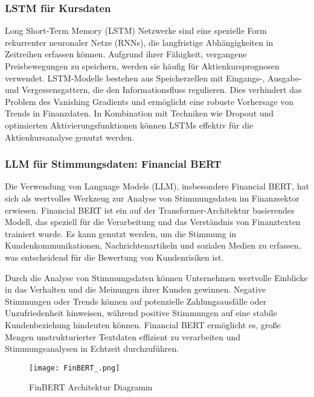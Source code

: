\autocite{chollet2017deep}
\autocite{brownlee2018deep}
\autocite{abiodun2019comprehensive}

\subsubsection{LSTM für Kursdaten}\label{sec:lstm-kursdaten}

Long Short-Term Memory (LSTM) Netzwerke sind eine spezielle Form rekurrenter neuronaler Netze (RNNs), die langfristige Abhängigkeiten in Zeitreihen erfassen können. Aufgrund ihrer Fähigkeit, vergangene Preisbewegungen zu speichern, werden sie häufig für Aktienkursprognosen verwendet. LSTM-Modelle bestehen aus Speicherzellen mit Eingangs-, Ausgabe- und Vergessensgattern, die den Informationsfluss regulieren. Dies verhindert das Problem des Vanishing Gradients und ermöglicht eine robuste Vorhersage von Trends in Finanzdaten. In Kombination mit Techniken wie Dropout und optimierten Aktivierungsfunktionen können LSTMs effektiv für die Aktienkursanalyse genutzt werden.

\autocite{hochreiter1997long}
\autocite{fischer2018deep}
\autocite{siami2019performance}

\subsubsection{LLM für Stimmungsdaten: Financial BERT}

Die Verwendung von Language Models (LLM), insbesondere Financial BERT, hat sich als wertvolles Werkzeug zur Analyse von Stimmungsdaten im Finanzsektor erwiesen. Financial BERT ist ein auf der Transformer-Architektur basierendes Modell, das speziell für die Verarbeitung und das Verständnis von Finanztexten trainiert wurde. Es kann genutzt werden, um die Stimmung in Kundenkommunikationen, Nachrichtenartikeln und sozialen Medien zu erfassen, was entscheidend für die Bewertung von Kundenrisiken ist.

Durch die Analyse von Stimmungsdaten können Unternehmen wertvolle Einblicke in das Verhalten und die Meinungen ihrer Kunden gewinnen. Negative Stimmungen oder Trends können auf potenzielle Zahlungsausfälle oder Unzufriedenheit hinweisen, während positive Stimmungen auf eine stabile Kundenbeziehung hindeuten können. Financial BERT ermöglicht es, große Mengen unstrukturierter Textdaten effizient zu verarbeiten und Stimmungsanalysen in Echtzeit durchzuführen.

\begin{figure}[H]
	\centering
	\texttt{[image: FinBERT\_.png]}
	\caption{FinBERT Architektur Diagramm}
	\label{fig:finbert_architecture}
\end{figure}

